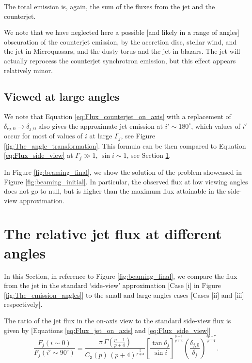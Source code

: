 The total emission is, again, the sum of the fluxes from the jet and the counterjet.

We note that we have neglected here a possible [and likely in a range of angles] obscuration of the counterjet emission, by the accretion disc, stellar wind, and the jet in Microquasars, and the dusty torus and the jet in blazars. The jet will actually reprocess the counterjet synchrotron emission, but this effect appears relatively minor.





\subsection{Viewed at large angles}
We note that Equation \ref{eq:Flux_counterjet_on_axis} with a replacement of $ \delta_{cj,0} \rightarrow \delta_{j,0} $ also gives the approximate jet emission at $ i' \sim 180 ^{\circ} $, which values of $i'$ occur for most of values of $i$ at large $ \Gamma_j $, see Figure \ref{fig:The_angle_transformation}. This formula can be then compared to Equation \ref{eq:Flux_side_view} at $\Gamma_j \gg 1$, $\sin i \sim 1$, see Section \ref{sec:comparison}.

In Figure \ref{fig:beaming_final}, we show the solution of the problem showcased in Figure \ref{fig:beaming_initial}. In particular, the observed flux at low viewing angles does not go to null, but is higher than the maximum flux attainable in the side-view approximation.






\section{The relative jet flux at different angles}
\label{sec:comparison}
In this Section, in reference to Figure \ref{fig:beaming_final}, we compare the flux from the jet in the standard `side-view' approximation [Case [i] in Figure \ref{fig:The_emission_angles}] to the small and large angles cases [Cases [ii] and [iii] respectively].

The ratio of the jet flux in the on-axis view to the standard side-view flux is given by [Equations \ref{eq:Flux_jet_on_axis} and \ref{eq:Flux_side_view}]
\begin{equation}
\frac{F_j (i \sim 0)}{F_j (i' \sim 90^{\circ})} = \dfrac{ \pi \, \Gamma \left( \frac{p-1}{p+4} \right) }{ C_3(p) \, (p+4)^{\frac{5}{p+4}} } \left[ \frac{\tan \theta_j}{\sin i} \right]^{ \frac{p-1}{p+4} } \left( \frac{\delta_{j,0}}{\delta_j} \right)^{ \frac{3p+7}{p+4} }.
\end{equation}

